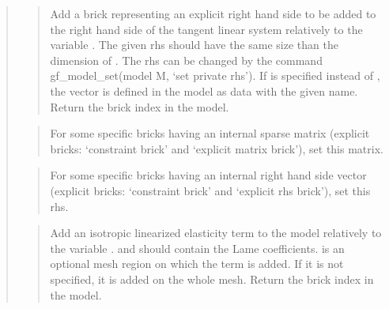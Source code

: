 \documentclass[a4paper,11pt,english]{sphinxmanual}
\begin{document}
\begin{quote}
\begin{quote}

Add a brick representing an explicit right hand side to be added to
the right hand side of the tangent linear system relatively to the
variable . The given rhs should have the same size than the
dimension of . The rhs can be changed by the command
gf\_model\_set(model M, ‘set private rhs’). If  is specified instead of
, the vector  is defined in the model as data with the given name.
Return the brick index in the model.
\end{quote}

\begin{quote}

For some specific bricks having an internal sparse matrix
(explicit bricks: ‘constraint brick’ and ‘explicit matrix brick’),
set this matrix.
\end{quote}

\begin{quote}

For some specific bricks having an internal right hand side vector
(explicit bricks: ‘constraint brick’ and ‘explicit rhs brick’),
set this rhs.
\end{quote}

\begin{quote}

Add an isotropic linearized elasticity term to the model relatively to
the variable .  and  should
contain the Lame coefficients.  is an optional mesh region
on which the term is added. If it is not specified, it is added
on the whole mesh. Return the brick index in the model.
\end{quote}

\begin{quote}


\end{quote}
\end{quote}
\end{document}
